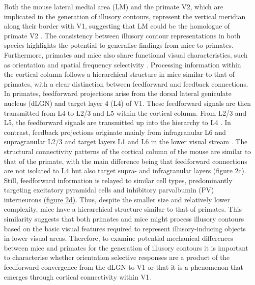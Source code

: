 \documentclass[12pt]{article}
\begin{document}
Both the mouse lateral medial area (LM) and the primate V2, which are implicated in the generation of illusory contours, represent the vertical meridian along their border with V1, suggesting that LM could be the homologue of primate V2 \autocite{gamanutAnatomicalFunctionalConnectomes2022}. The consistency between illusory contour representations in both species highlights the potential to generalise findings from mice to primates. Furthermore, primates and mice also share functional visual characteristics, such as orientation and spatial frequency selectivity \autocite{niellHighlySelectiveReceptive2008}. Processing information within the cortical column follows a hierarchical structure in mice similar to that of primates, with a clear distinction between feedforward and feedback connections. In primates, feedforward projections arise from the dorsal lateral geniculate nucleus (dLGN) and target layer 4 (L4) of V1. These feedforward signals are then transmitted from L4 to L2/3 and L5 within the cortical column. From L2/3 and L5, the feedforward signals are transmitted up into the hierarchy to L4 \autocite{markovAnatomyHierarchyFeedforward2014}. In contrast, feedback projections originate mainly from infragranular L6 and supragranular L2/3 and target layers L1 and L6 in the lower visual stream \autocite{rocklandWhatWeKnow2019}. The structural connectivity patterns of the cortical column of the mouse are similar to that of the primate, with the main difference being that feedforward connections are not isolated to L4 but also target supra- and infragranular layers \hyperref[fig:Laminar_Figure]{(figure 2c)}. Still, feedforward information is relayed to similar cell types, predominantly targeting excitatory pyramidal cells and inhibitory parvalbumin (PV) interneurons \hyperref[fig:Laminar_Figure]{(figure 2d)}. Thus, despite the smaller size and relatively lower complexity, mice have a hierarchical structure similar to that of primates. This similarity suggests that both primates and mice might process illusory contours based on the basic visual features required to represent illusory-inducing objects in lower visual areas. Therefore, to examine potential mechanical differences between mice and primates for the generation of illusory contours it is important to characterise whether orientation selective responses are a product of the feedforward convergence from the dLGN to V1 or that it is a phenomenon that emerges through cortical connectivity within V1.
\end{document}
